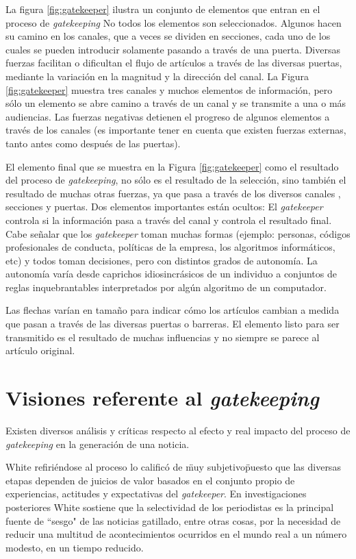 La figura \ref{fig:gatekeeper} ilustra un conjunto de elementos que entran en el proceso de \emph{gatekeeping}
No todos los elementos son seleccionados. Algunos hacen su camino en los canales, que a veces se dividen en secciones, cada uno de los cuales se pueden introducir solamente pasando a través de una puerta. Diversas fuerzas facilitan o dificultan el flujo de artículos a través de las diversas puertas, mediante la variación en la magnitud y la dirección del canal. La Figura \ref{fig:gatekeeper} muestra tres canales y muchos elementos de información, pero sólo un elemento se abre camino a través de un canal y se transmite a una o más audiencias. Las fuerzas negativas detienen el progreso de algunos elementos a través de los canales (es importante tener en cuenta que existen fuerzas externas, tanto antes como después de las puertas).

El elemento final que se muestra en la Figura \ref{fig:gatekeeper} como el resultado del proceso de \emph{gatekeeping}, no sólo es el resultado de la selección, sino también el resultado de muchas otras fuerzas, ya que pasa a través de los diversos canales , secciones y puertas. Dos elementos importantes están ocultos: El \emph{gatekeeper} controla si la información pasa a través del canal y controla el resultado final. Cabe señalar que los \emph{gatekeeper} toman muchas formas (ejemplo: personas, códigos profesionales de conducta, políticas de la empresa, los algoritmos informáticos, etc) y todos toman decisiones, pero con distintos grados de autonomía. La autonomía varía desde caprichos idiosincrásicos de un individuo a conjuntos de reglas inquebrantables interpretados por algún algoritmo de un computador.

Las flechas varían en tamaño para indicar cómo los artículos cambian a medida que pasan a través de las diversas puertas o barreras.
El elemento listo para ser transmitido es el resultado de muchas influencias y no siempre se parece al artículo original.

\section{Visiones referente al \emph{gatekeeping}}

Existen diversos análisis y críticas respecto al efecto y real impacto del proceso de \emph{gatekeeping} en la generación de una noticia.

White\cite{white} refiriéndose al proceso lo calificó de \"muy subjetivo\" puesto que las diversas etapas dependen de juicios de valor basados en el conjunto propio de experiencias, actitudes y expectativas del \emph{gatekeeper}. En investigaciones posteriores White sostiene que la selectividad de los periodistas es la principal fuente de ``sesgo" de las noticias gatillado, entre otras cosas, por la necesidad de reducir una multitud de acontecimientos ocurridos en el mundo real a un número modesto, en un tiempo reducido. 

